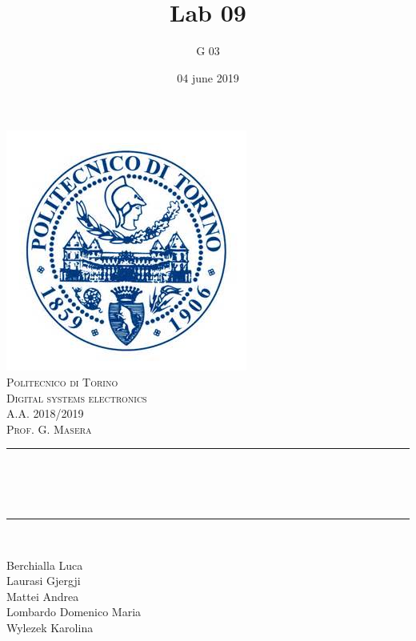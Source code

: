 \documentclass[12pt]{article}
\title{Lab 09}													%
\author{G 03}														%
\date{04 june 2019}														%
\makeatletter
\let\thetitle\@title
\let\thedate\@date
\makeatother
\begin{document}

\begin{titlepage}
	\centering
    \vspace*{0.5 cm}
    \includegraphics[scale = 0.75]{polito.jpg}\\[1.0 cm]				%
    \textsc{\LARGE Politecnico di Torino}\\[2.0 cm]						%
	\textsc{\Large Digital systems electronics\\ A.A. 2018/2019}\\[0.5 cm]		%
	\textsc{\Large Prof. G. Masera}\\[0.5 cm]		%
	\rule{\linewidth}{0.2 mm} \\[0.4 cm]
	{ \huge \bfseries \thetitle \\ \small \thedate}\\
	\rule{\linewidth}{0.2 mm} \\[1.5 cm]
	
	\begin{minipage}{0.4\textwidth}
		\begin{flushleft} \large
			Berchialla Luca\\												%
			Laurasi Gjergji
			\\
			
			Mattei Andrea\\
            Lombardo Domenico Maria\\
            Wylezek Karolina
            
			\end{flushleft}
			\end{minipage}~
			\begin{minipage}{0.4\textwidth}
            

\end{minipage}
\end{titlepage}
\end{document}
